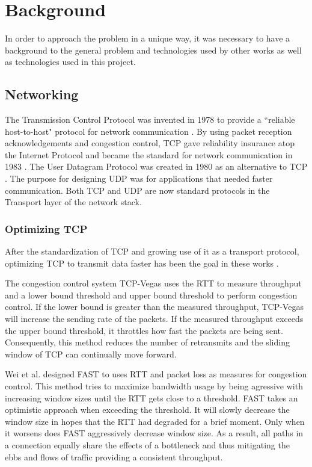 \chapter{Background}

In order to approach the problem in a unique way, it was necessary to have a background to the general problem and technologies used by other works as well as technologies used in this project.

\section{Networking}

The Transmission Control Protocol was invented in 1978 to provide a ``reliable host-to-host" protocol for network communication \cite{cerf1978specification}. By using packet reception acknowledgements and congestion control, TCP gave reliability insurance atop the Internet Protocol and became the standard for network communication in 1983 \cite{andrews2013who}. The User Datagram Protocol was created in 1980 as an alternative to TCP \cite{postel1980user}\cite{kozierokr2005udp}. The purpose for designing UDP was for applications that needed faster communication. Both TCP and UDP are now standard protocols in the Transport layer of the network stack.

\subsection{Optimizing TCP}

After the standardization of TCP and growing use of it as a transport protocol, optimizing TCP to transmit data faster has been the goal in these works \cite{brakmo1995tcp}\cite{wei2006fast}\cite{ha2008cubic}. 

The congestion control system TCP-Vegas \cite{brakmo1995tcp} uses the RTT to measure throughput and a lower bound threshold and upper bound threshold to perform congestion control. If the lower bound is greater than the measured throughput, TCP-Vegas will increase the sending rate of the packets. If the measured throughput exceeds the upper bound threshold, it throttles how fast the packets are being sent. Consequently, this method reduces the number of retransmits and the sliding window of TCP can continually move forward.

Wei et al. designed FAST to uses RTT and packet loss as measures for congestion control. This method tries to maximize bandwidth usage by being agressive with increasing window sizes until the RTT gets close to a threshold. FAST takes an optimistic approach when exceeding the threshold. It will slowly decrease the window size in hopes that the RTT had degraded for a brief moment. Only when it worsens does FAST aggressively decrease window size. As a result, all paths in a connection equally share the effects of a bottleneck and thus mitigating the ebbs and flows of traffic providing a consistent throughput.

